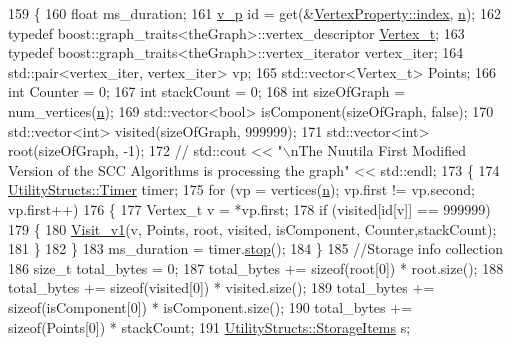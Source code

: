 \begin{DoxyCode}
159 \{
160     \textcolor{keywordtype}{float} ms\_duration;
161     \hyperlink{utilities_8h_a3f4959b3d837fa6351a9414c79280286}{v\_p} \textcolor{keywordtype}{id} = \textcolor{keyword}{get}(&\hyperlink{struct_utility_structs_1_1_vertex_property_a636cb729438e999aa3d9a17ac39d8641}{VertexProperty::index}, \hyperlink{class_nuutila_a1409929fa0f38709497f8bdb012af71c}{n});
162     \textcolor{keyword}{typedef} boost::graph\_traits<theGraph>::vertex\_descriptor \hyperlink{class_graph_component_ae67114a6ce5a001dc35e1996e1b45aa0}{Vertex\_t};
163     \textcolor{keyword}{typedef} boost::graph\_traits<theGraph>::vertex\_iterator vertex\_iter;
164     std::pair<vertex\_iter, vertex\_iter> vp;
165     std::vector<Vertex\_t> Points;
166     \textcolor{keywordtype}{int} Counter = 0;
167     \textcolor{keywordtype}{int} stackCount = 0;
168     \textcolor{keywordtype}{int} sizeOfGraph = num\_vertices(\hyperlink{class_nuutila_a1409929fa0f38709497f8bdb012af71c}{n});
169     std::vector<bool> isComponent(sizeOfGraph, \textcolor{keyword}{false});
170     std::vector<int> visited(sizeOfGraph, 999999);
171     std::vector<int> root(sizeOfGraph, -1);
172     \textcolor{comment}{//    std::cout << "\(\backslash\)nThe Nuutila First Modified Version of the SCC Algorithms is processing the graph"
       << std::endl;}
173     \{
174         \hyperlink{class_utility_structs_1_1_timer}{UtilityStructs::Timer} timer;
175         \textcolor{keywordflow}{for} (vp = vertices(\hyperlink{class_nuutila_a1409929fa0f38709497f8bdb012af71c}{n}); vp.first != vp.second; vp.first++)
176         \{
177             Vertex\_t v = *vp.first;
178             \textcolor{keywordflow}{if} (visited[\textcolor{keywordtype}{id}[v]] == 999999)
179             \{
180                 \hyperlink{class_nuutila_a83b47177cf452e80b3ceaf064ff59840}{Visit\_v1}(v, Points, root, visited, isComponent, Counter,stackCount);
181             \}
182         \}
183         ms\_duration = timer.\hyperlink{class_utility_structs_1_1_timer_a12f62b57c263d563efd6089cff52355f}{stop}();
184     \}
185     \textcolor{comment}{//Storage info collection}
186     \textcolor{keywordtype}{size\_t} total\_bytes = 0;
187     total\_bytes += \textcolor{keyword}{sizeof}(root[0]) * root.size();
188     total\_bytes += \textcolor{keyword}{sizeof}(visited[0]) * visited.size();
189     total\_bytes += \textcolor{keyword}{sizeof}(isComponent[0]) * isComponent.size();
190     total\_bytes += \textcolor{keyword}{sizeof}(Points[0]) * stackCount;
191     \hyperlink{struct_utility_structs_1_1_storage_items}{UtilityStructs::StorageItems} s;

\end{DoxyCode}
